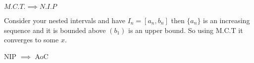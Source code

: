 \vspace{1em}

\hline
\vspace{1em}


\begin{eg}
	$M.C.T. \implies N.I.P$

	Consider your nested intervals and have  $I_n = [a_n, b_n]$ then  $\{a_n\} $ is an increasing sequence and it is bounded above $(b_1)$ is an upper bound. So using M.C.T it converges to some $x$.
\end{eg}

\begin{eg}
	NIP $\implies$ AoC


\end{eg}

